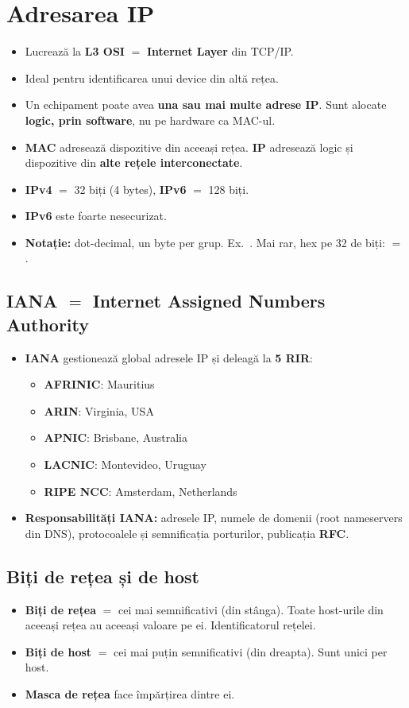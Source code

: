 \documentclass[11pt,a4paper]{article}
\begin{document}
\section{Adresarea IP}
\begin{itemize}
  \item Lucrează la \textbf{L3 OSI} $=$ \textbf{Internet Layer} din TCP/IP.
  \item Ideal pentru identificarea unui device din altă rețea.
  \item Un echipament poate avea \textbf{una sau mai multe adrese IP}. Sunt alocate \textbf{logic, prin software}, nu pe hardware ca MAC-ul.
  \item \textbf{MAC} adresează dispozitive din aceeași rețea. \textbf{IP} adresează logic și dispozitive din \textbf{alte rețele interconectate}.
  \item \textbf{IPv4} $=$ 32 biți (4 bytes), \textbf{IPv6} $=$ 128 biți.
  \item \textbf{IPv6} este foarte nesecurizat.
  \item \textbf{Notație:} dot-decimal, un byte per grup. Ex.\ . Mai rar, hex pe 32 de biți:  $=$ .
\end{itemize}

\subsection*{IANA $=$ Internet Assigned Numbers Authority}
\begin{itemize}
  \item \textbf{IANA} gestionează global adresele IP și deleagă la \textbf{5 RIR}:
  \begin{itemize}
    \item \textbf{AFRINIC}: Mauritius
    \item \textbf{ARIN}: Virginia, USA
    \item \textbf{APNIC}: Brisbane, Australia
    \item \textbf{LACNIC}: Montevideo, Uruguay
    \item \textbf{RIPE NCC}: Amsterdam, Netherlands
  \end{itemize}
  \item \textbf{Responsabilități IANA:} adresele IP, numele de domenii (root nameservers din DNS), protocoalele și semnificația porturilor, publicația \textbf{RFC}.
\end{itemize}

\subsection*{Biți de rețea și de host}
\begin{itemize}
  \item \textbf{Biți de rețea} $=$ cei mai semnificativi (din stânga). Toate host-urile din aceeași rețea au aceeași valoare pe ei. Identificatorul rețelei.
  \item \textbf{Biți de host} $=$ cei mai puțin semnificativi (din dreapta). Sunt unici per host.
  \item \textbf{Masca de rețea} face împărțirea dintre ei.
\end{itemize}
\end{document}
